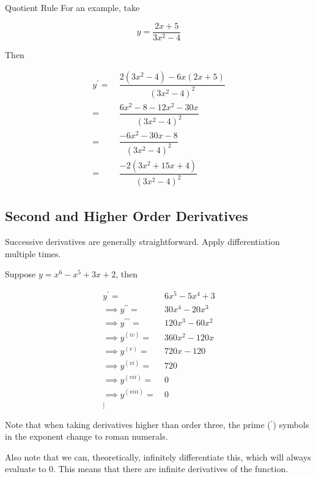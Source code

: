 \begin{example}{Quotient Rule}
    For an example, take
    
    \[ y = \dfrac{2x + 5}{3x^2 - 4} \]
    
    Then
    
    \begin{align*}
        y^\prime = \> &\dfrac{2 \left( 3x^2 - 4 \right) - 6x \left(2x + 5 \right)}{\left(3x^2 - 4 \right)^2} \\
        = \> &\dfrac{6x^2 - 8 - 12x^2 - 30x}{\left( 3x^2 - 4 \right)^2} \\
        = \> &\dfrac{-6x^2 - 30x - 8}{\left(3x^2 - 4 \right)^2} \\
        = \> &\dfrac{-2 \left(3x^2 + 15x + 4 \right)}{\left(3x^2 - 4 \right)^2}
    \end{align*}
\end{example}

\subsection{Second and Higher Order Derivatives}

Successive derivatives are generally straightforward. Apply differentiation multiple times.

Suppose \( y = x^6 - x^5 + 3x + 2 \), then

\begin{align}
    y^\prime = \> &6x^5 - 5x^4 + 3 \\
    \implies y^{\prime \prime} = \> &30x^4 - 20x^3 \\
    \implies y^{\prime \prime \prime} = \> &120x^3 - 60x^2 \\
    \implies y^{(iv)} = \> &360x^2 - 120x \\
    \implies y^{(v)} = \> &720x - 120 \\
    \implies y^{(vi)} = \> &720 \\
    \implies y^{(vii)} = \> &0 \\
    \implies y^{(viii)} = \> &0 \\
    \vdots
\end{align}

Note that when taking derivatives higher than order three, the prime (\(^\prime\)) symbols in the exponent change to roman numerals.

Also note that we can, theoretically, infinitely differentiate this, which will always evaluate to \( 0 \). This means that there are infinite derivatives of the function.

